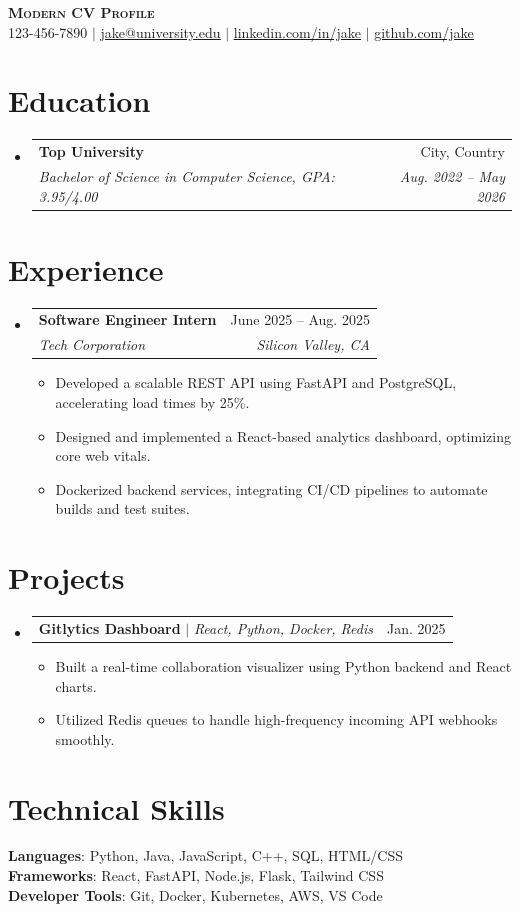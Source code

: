 \documentclass[letterpaper,11pt]{article}
\makeatletter
\newcommand{\resumeItem}[1]{
  \item\small{
    {#1 \vspace{-2pt}}
  }
}
\newcommand{\resumeSubheading}[4]{
  \vspace{-2pt}\item
    \begin{tabular*}{0.97\textwidth}[t]{l@{\extracolsep{\fill}}r}
      \textbf{#1} & #2 \\
      \textit{\small#3} & \textit{\small #4} \\
    \end{tabular*}\vspace{-7pt}
}
\newcommand{\resumeProjectHeading}[2]{
    \item
    \begin{tabular*}{0.97\textwidth}{l@{\extracolsep{\fill}}r}
      \small#1 & #2 \\
    \end{tabular*}\vspace{-7pt}
}
\newcommand{\resumeSubHeadingListStart}{\begin{itemize}[leftmargin=0.15in, label={}]}
\newcommand{\resumeSubHeadingListEnd}{\end{itemize}}
\newcommand{\resumeItemListStart}{\begin{itemize}}
\newcommand{\resumeItemListEnd}{\end{itemize}\vspace{-5pt}}
\makeatother
\begin{document}
\begin{center}
    \textbf{\Huge \scshape Modern CV Profile} \\ \vspace{1pt}
    \small 123-456-7890 $|$ \href{mailto:jake@university.edu}{\underline{jake@university.edu}} $|$ 
    \href{https://linkedin.com}{\underline{linkedin.com/in/jake}} $|$
    \href{https://github.com}{\underline{github.com/jake}}
\end{center}

\section{Education}
  \resumeSubHeadingListStart
    \resumeSubheading
      {Top University}{City, Country}
      {Bachelor of Science in Computer Science, GPA: 3.95/4.00}{Aug. 2022 -- May 2026}
  \resumeSubHeadingListEnd

\section{Experience}
  \resumeSubHeadingListStart
    \resumeSubheading
      {Software Engineer Intern}{June 2025 -- Aug. 2025}
      {Tech Corporation}{Silicon Valley, CA}
      \resumeItemListStart
        \resumeItem{Developed a scalable REST API using FastAPI and PostgreSQL, accelerating load times by 25\%.}
        \resumeItem{Designed and implemented a React-based analytics dashboard, optimizing core web vitals.}
        \resumeItem{Dockerized backend services, integrating CI/CD pipelines to automate builds and test suites.}
      \resumeItemListEnd
  \resumeSubHeadingListEnd

\section{Projects}
  \resumeSubHeadingListStart
    \resumeProjectHeading
      {\textbf{Gitlytics Dashboard} $|$ \emph{React, Python, Docker, Redis}}{Jan. 2025}
      \resumeItemListStart
        \resumeItem{Built a real-time collaboration visualizer using Python backend and React charts.}
        \resumeItem{Utilized Redis queues to handle high-frequency incoming API webhooks smoothly.}
      \resumeItemListEnd
  \resumeSubHeadingListEnd

\section{Technical Skills}
 \begin{itemize}[leftmargin=0.15in, label={}]
    \small{\item{
     \textbf{Languages}{: Python, Java, JavaScript, C++, SQL, HTML/CSS} \\
     \textbf{Frameworks}{: React, FastAPI, Node.js, Flask, Tailwind CSS} \\
     \textbf{Developer Tools}{: Git, Docker, Kubernetes, AWS, VS Code}
    }}
 \end{itemize}
\end{document}
